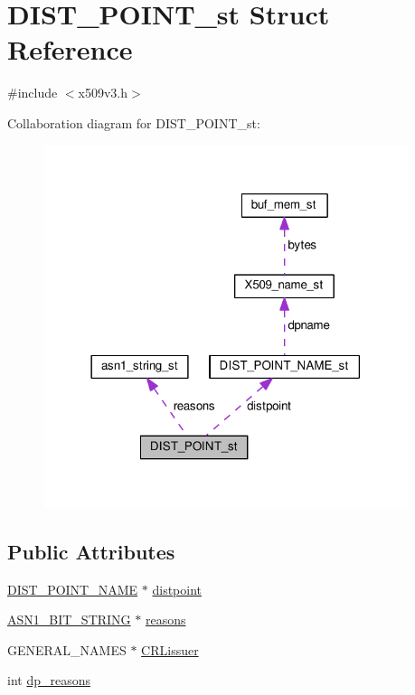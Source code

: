 \hypertarget{struct_d_i_s_t___p_o_i_n_t__st}{}\section{D\+I\+S\+T\+\_\+\+P\+O\+I\+N\+T\+\_\+st Struct Reference}
\label{struct_d_i_s_t___p_o_i_n_t__st}


{\ttfamily \#include $<$x509v3.\+h$>$}



Collaboration diagram for D\+I\+S\+T\+\_\+\+P\+O\+I\+N\+T\+\_\+st\+:
\nopagebreak
\begin{figure}[H]
\begin{center}
\leavevmode
\includegraphics[width=302pt]{struct_d_i_s_t___p_o_i_n_t__st__coll__graph}
\end{center}
\end{figure}
\subsection*{Public Attributes}
\begin{DoxyCompactItemize}
\item 
\hyperlink{x509v3_8h_a1e98b413217a18a88255e02b31263c93}{D\+I\+S\+T\+\_\+\+P\+O\+I\+N\+T\+\_\+\+N\+A\+ME} $\ast$ \hyperlink{struct_d_i_s_t___p_o_i_n_t__st_a8c519036ea9d52503225c5417b6239b8}{distpoint}
\item 
\hyperlink{ossl__typ_8h_af837aaa00e151b1e8773aea5a8fe1cc4}{A\+S\+N1\+\_\+\+B\+I\+T\+\_\+\+S\+T\+R\+I\+NG} $\ast$ \hyperlink{struct_d_i_s_t___p_o_i_n_t__st_adadc29440678f7d0df1f8fb9319ba87c}{reasons}
\item 
G\+E\+N\+E\+R\+A\+L\+\_\+\+N\+A\+M\+ES $\ast$ \hyperlink{struct_d_i_s_t___p_o_i_n_t__st_a9dd08da439a604af4d6bc6cf68acf4f6}{C\+R\+Lissuer}
\item 
int \hyperlink{struct_d_i_s_t___p_o_i_n_t__st_a4f2ea5592417459b8d97a97515380a75}{dp\+\_\+reasons}
\end{DoxyCompactItemize}


